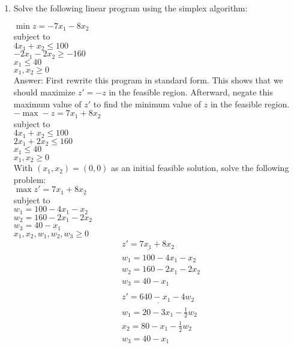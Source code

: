 \documentclass{article}
\begin{document}
\begin{enumerate}
\newpage
\item

Solve the following linear program using the simplex algorithm:

$\min z = -7x_1 - 8x_2$\\
subject to \\
$4x_1 +x_2 \leq 100$\\
$-2x_1 - 2x_2 \geq -160$ \\
$x_1 \leq 40$\\
$x_1, x_2 \geq 0$\\

Answer: First rewrite this program in standard form. This shows that we should maximize $z' = -z$ in the feasible region. Afterward, negate this maximum value of $z'$ to find the minimum value of $z$ in the feasible region. \\

$-\max -z = 7x_1 + 8x_2$\\
subject to \\
$4x_1 +x_2 \leq 100$\\
$2x_1 + 2x_2 \leq 160$ \\
$x_1 \leq 40$\\
$x_1, x_2 \geq 0$\\

With $(x_1, x_2) = (0,0)$ as an initial feasible solution, solve the following problem:\\

$\max z' = 7x_1 + 8x_2$\\
subject to \\
$w_1 = 100 - 4x_1 - x_2$\\
$w_2 = 160 - 2x_1 - 2x_2$ \\
$w_3 = 40 - x_1$ \\
$x_1, x_2, w_1, w_2, w_3 \geq 0$\\

\begin{align*}
&\underline{z' = 7x_1 + 8x_2} \\
&w_1 = 100 - 4x_1 - x_2 \\
&w_2 = 160 - 2x_1 - 2x_2 \\
&w_3 = 40 - x_1 \\
&\\
&\underline{z' = 640 - x_1 - 4w_2} \\
&w_1 = 20 - 3x_1 - \frac{1}{2}w_2 \\
&x_2 = 80 - x_1 - \frac{1}{2}w_2 \\
&w_3 = 40 - x_1 \\
&\\
\end{align*}


\end{enumerate}
\end{document}

